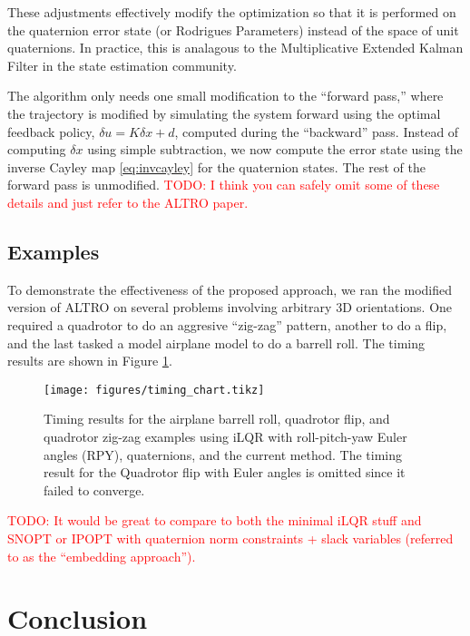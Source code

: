\documentclass[letterpaper, 10 pt, conference]{ieeeconf}  %
\newcommand{\todo}[1]{\textcolor{red}{TODO: #1}}
\begin{document}
    These adjustments effectively modify the optimization so that it is performed on the
    quaternion error state (or Rodrigues Parameters) instead of the space of unit
    quaternions. In practice, this is analagous to the Multiplicative Extended Kalman
    Filter \cite{markley2014fundamentals} in the state estimation community.

    The algorithm only needs one small modification to the ``forward pass,'' where the
    trajectory is modified by simulating the system forward using the optimal feedback
    policy, $\delta u = K \delta x + d$, computed during the ``backward'' pass. Instead of 
    computing $\delta x$ using simple subtraction, we now compute the error state using the
    inverse Cayley map \eqref{eq:invcayley} for the quaternion states. The rest of the
    forward pass is unmodified. \todo{I think you can safely omit some of these details and just refer to the ALTRO paper.}

    \subsection{Examples}
        To demonstrate the effectiveness of the proposed approach, we ran the modified
        version of ALTRO on several problems involving arbitrary 3D orientations. One 
        required a quadrotor to do an aggresive ``zig-zag'' pattern, another to do a flip,
        and the last tasked a model airplane model to do a barrell roll. The timing results
        are shown in Figure \ref{fig:timing_chart}.
        \begin{figure}
            \centering
            \texttt{[image: figures/timing\_chart.tikz]}
            \caption{Timing results for the airplane barrell roll, quadrotor flip, and
            quadrotor zig-zag examples using iLQR with roll-pitch-yaw Euler angles (RPY),
            quaternions, and the current method. The timing result for the Quadrotor flip
            with Euler angles is omitted since it failed to converge.
            }
            \label{fig:timing_chart}
        \end{figure}
        
        \todo{It would be great to compare to both the minimal iLQR stuff and SNOPT or IPOPT with quaternion norm constraints + slack variables (referred to as the ``embedding approach'').}

\section{Conclusion} 
\end{document}
